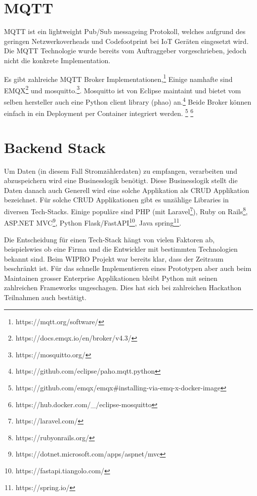 
\section{MQTT} %
\label{state:mqtt}

\ac{MQTT} ist ein lightweight Pub/Sub messageing Protokoll, welches aufgrund des
geringen Netzwerkoverheads und Codefootprint bei \ac{IoT} Geräten eingesetzt wird.\cite{mqtt}
Die \ac{MQTT} Technologie wurde bereits vom Auftraggeber vorgeschrieben, jedoch
nicht die konkrete Implementation.

Es gibt zahlreiche \ac{MQTT} Broker Implementationen,\footnote{https://mqtt.org/software/}
Einige namhafte sind EMQX\footnote{https://docs.emqx.io/en/broker/v4.3/} und mosquitto.\footnote{https://mosquitto.org/}.
Mosquitto ist von Eclipse maintaint und bietet vom selben hersteller auch eine
Python client library (phao) an.\footnote{https://github.com/eclipse/paho.mqtt.python}
Beide Broker können einfach in ein Deployment per Container integriert werden.
\footnote{https://github.com/emqx/emqx\#installing-via-emq-x-docker-image} \footnote{https://hub.docker.com/\_/eclipse-mosquitto}

\section{Backend Stack}
\label{state:backend}

Um Daten (in diesem Fall Stromzählerdaten) zu empfangen, verarbeiten und abzuspeichern
wird eine Businesslogik benötigt. Diese Businesslogik stellt die Daten
danach auch  Generell wird eine solche Applikation als \ac{CRUD} Applikation
bezeichnet. \parencite{sulemani_2021} \parencite{johnston_2021}
Für solche \ac{CRUD} Applikationen gibt es unzählige Libraries in diversen Tech-Stacks.
Einige populäre sind PHP (mit Laravel\footnote{https://laravel.com/}),
Ruby on Rails\footnote{https://rubyonrails.org/}, ASP.NET MVC\footnote{https://dotnet.microsoft.com/apps/aspnet/mvc},
Python Flask/FastAPI\footnote{https://fastapi.tiangolo.com/}, Java spring\footnote{https://spring.io/}.

Die Entscheidung für einen Tech-Stack hängt von vielen Faktoren ab, beispielswies
ob eine Firma und die Entwickler mit bestimmten Technologien bekannt sind.
Beim WIPRO Projekt war bereits klar, dass der Zeitraum beschränkt ist.
Für das schnelle Implementieren eines Prototypen aber auch beim Maintainen
grosser Enterprise Applikationen bleibt Python mit seinen zahlreichen
Frameworks ungeschagen. Dies hat sich bei zahlreichen Hackathon Teilnahmen
auch bestätigt.

